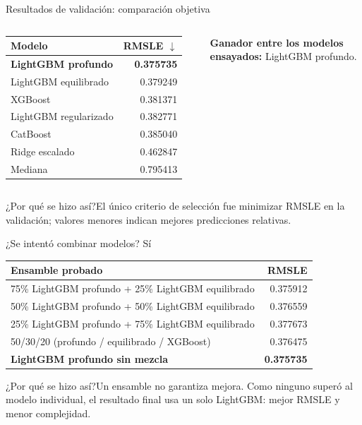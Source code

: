\documentclass[aspectratio=169,11pt]{beamer}
\newcommand{\porq}[1]{\vspace{1.2mm}\begin{block}{¿Por qué se hizo así?}\small #1\end{block}}
\begin{document}
\begin{frame}{Resultados de validación: comparación objetiva}
\begin{columns}[T]
\scriptsize
\begin{tabular}{lr}
\toprule Modelo & RMSLE $\downarrow$\\\midrule
\textbf{LightGBM profundo} & \textbf{0.375735}\\
LightGBM equilibrado & 0.379249\\
XGBoost & 0.381371\\
LightGBM regularizado & 0.382771\\
CatBoost & 0.385040\\
Ridge escalado & 0.462847\\
Mediana & 0.795413\\
\bottomrule
\end{tabular}
\par\vspace{3mm}
\noindent\textbf{Ganador entre los modelos ensayados:} LightGBM profundo.
\end{columns}
\porq{El único criterio de selección fue minimizar RMSLE en la validación; valores menores indican mejores predicciones relativas.}
\end{frame}

\begin{frame}{¿Se intentó combinar modelos? Sí}
\small
\begin{tabular}{p{.75\linewidth}r}
\toprule
\textbf{Ensamble probado} & \textbf{RMSLE}\\\midrule
75\% LightGBM profundo + 25\% LightGBM equilibrado & 0.375912\\
50\% LightGBM profundo + 50\% LightGBM equilibrado & 0.376559\\
25\% LightGBM profundo + 75\% LightGBM equilibrado & 0.377673\\
50/30/20 (profundo / equilibrado / XGBoost) & 0.376475\\
\midrule
\textbf{LightGBM profundo sin mezcla} & \textbf{0.375735}\\\bottomrule
\end{tabular}
\vspace{2mm}
\porq{Un ensamble no garantiza mejora. Como ninguno superó al modelo individual, el resultado final usa un solo LightGBM: mejor RMSLE y menor complejidad.}
\end{frame}
\end{document}
